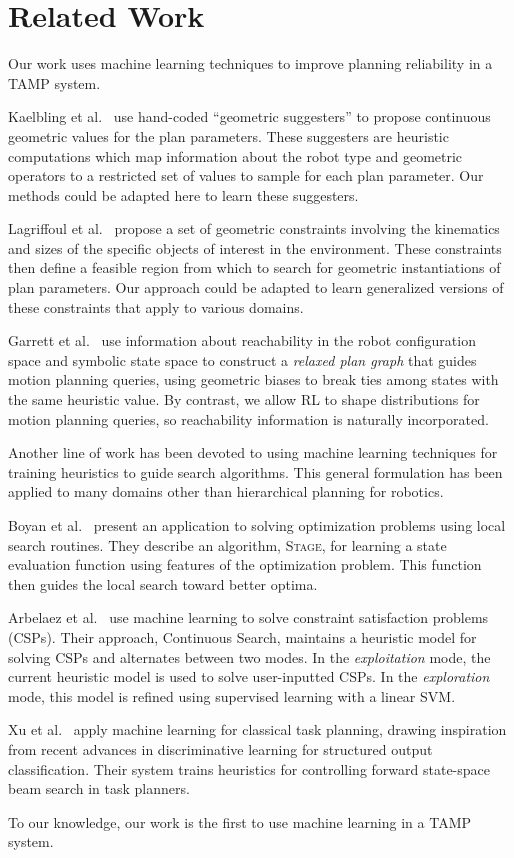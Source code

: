 \section{Related Work}
Our work uses machine learning techniques to improve planning reliability in a TAMP system.

Kaelbling et al.~\cite{kaelbling2011hierarchical} use hand-coded ``geometric suggesters'' to propose
continuous geometric values for the plan parameters. These suggesters are heuristic
computations which map information about the robot type and geometric operators to a restricted
set of values to sample for each plan parameter. Our methods could be adapted here to learn these
suggesters.

Lagriffoul et al.~\cite{lagriffoul2014orientation}
propose a set of geometric constraints involving the kinematics and sizes of the specific objects of
interest in the environment. These constraints then define a feasible region from which to search
for geometric instantiations of plan parameters. Our approach could be adapted to learn generalized
versions of these constraints that apply to various domains.

Garrett et al.~\cite{GarrettWAFR14} use information about reachability in the robot configuration
space and symbolic state space to construct a \emph{relaxed plan graph} that guides motion
planning queries, using geometric biases to break ties among states with the same heuristic value.
By contrast, we allow RL to shape distributions for motion planning queries, so reachability information
is naturally incorporated.

Another line of work has been devoted to using machine learning techniques for
training heuristics to guide search algorithms. This general formulation
has been applied to many domains other than hierarchical planning for robotics.

Boyan et al.~\cite{Boyanlearning} present an application to solving optimization
problems using local search routines. They describe an algorithm, \textsc{Stage},
for learning a state evaluation function using features of the optimization problem.
This function then guides the local search toward better optima.

Arbelaez et al.~\cite{hamadisearch} use machine learning to solve constraint
satisfaction problems (CSPs). Their approach, Continuous Search, maintains a heuristic
model for solving CSPs and alternates between two modes. In the \emph{exploitation} mode,
the current heuristic model is used to solve user-inputted CSPs. In the \emph{exploration}
mode, this model is refined using supervised learning with a linear SVM.

Xu et al.~\cite{Xu07discriminativelearning} apply machine learning for classical task
planning, drawing inspiration from recent advances in discriminative learning for
structured output classification. Their system trains heuristics for controlling forward
state-space beam search in task planners.

To our knowledge, our work is the first to use machine learning in a TAMP system.
